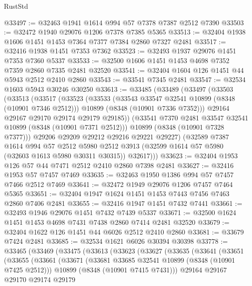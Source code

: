 \begin{lexlean}{RustStd}
\begin{coremodule}
@33497 := @32463 @1941 @1614 @994 @57 @7378 @7387 @2512 @7390
@33503 := @32472 @1940 @29076 @1206 @7378 @7385 @5365
@33513 := @32404 @1938 @1606 @1451 @1453 @7364 @7377 @7384 @2860 @7327 @2481
@33517 := @32416 @1938 @1451 @7353 @7362
@33523 := @32493 @1937 @29076 @1451 @7353 @7360 @5337
@33533 := @32500 @1606 @1451 @1453 @4698 @7352 @7359 @2860 @7335 @2481 @32520
@33541 := @32404 @1604 @126 @1451 @44 @5943 @2512 @2410 @2860
@33543 := @33541 @7345 @2481
@33547 := @32534 @1603 @5943 @30246 @30250
@33613 := @33485
    (@33489
      (@33497
        (@33503
          (@33513
            (@33517
              (@33523
                (@33533
                  (@33543 @33547 @32541 @10899 (@8348 (@10901 @7346 @2512)))
                  @10899
                  (@8348 (@10901 @7336 @7352)))
                @29164
                @29167
                @29170
                @29174
                @29179
                @29185))
            (@33541 @7370 @2481 @33547 @32541 @10899 (@8348 (@10901 @7371 @2512)))
            @10899
            (@8348 (@10901 @7328 @7377)))
          @29206
          @29209
          @29212
          @29216
          @29221
          @29227)
        (@32589
          @7387
          @1614
          @994
          @57
          @2512
          @5980
          @2512
          @3913
          (@32599 @1614 @57 @5980 (@32603 @1613 @5980 @30311 @30315))
          @32617)))
@33623 := @32404 @1953 @126 @57 @44 @7471 @2512 @2410 @2860 @7398 @2481
@33627 := @32416 @1953 @57 @7457 @7469
@33635 := @32463 @1950 @1386 @994 @57 @7457 @7466 @2512 @7469
@33641 := @32472 @1949 @29076 @1206 @7457 @7464 @5365
@33651 := @32404 @1947 @1624 @1451 @1453 @7443 @7456 @7463 @2860 @7406 @2481
@33655 := @32416 @1947 @1451 @7432 @7441
@33661 := @32493 @1946 @29076 @1451 @7432 @7439 @5337
@33671 := @32500 @1624 @1451 @1453 @4698 @7431 @7438 @2860 @7414 @2481 @32520
@33679 := @32404 @1622 @126 @1451 @44 @6026 @2512 @2410 @2860
@33681 := @33679 @7424 @2481
@33685 := @32534 @1621 @6026 @30394 @30398
@33778 := @33465
    (@33469
      (@33475
        (@33613
          (@33623
            (@33627
              (@33635
                (@33641
                  (@33651
                    (@33655
                      (@33661
                        (@33671
                          (@33681 @33685 @32541 @10899 (@8348 (@10901 @7425 @2512)))
                          @10899
                          (@8348 (@10901 @7415 @7431)))
                        @29164
                        @29167
                        @29170
                        @29174
                        @29179

\end{coremodule}
\end{lexlean}
